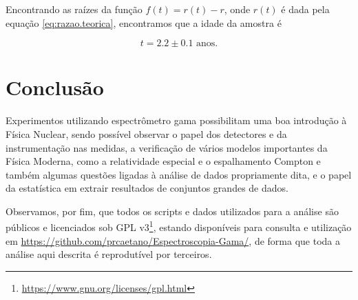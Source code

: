 \documentclass[a4paper, 11pt, notitlepage]{article}
\numberwithin{equation}{section}  %
\begin{document}
Encontrando as raízes da função $f(t) = r(t) - r$, onde $r(t)$ é dada pela equação \eqref{eq:razao.teorica}, encontramos que a idade da amostra é

\[ t = 2.2 \pm 0.1 \text{ anos.} \]

\section{Conclusão}

Experimentos utilizando espectrômetro gama possibilitam uma boa introdução à Física Nuclear, sendo possível observar o papel dos detectores e da instrumentação nas medidas, a verificação de vários modelos importantes da Física Moderna, como a relatividade especial e o espalhamento Compton e também algumas questões ligadas à análise de dados propriamente dita, e o papel da estatística em extrair resultados de conjuntos grandes de dados.

Observamos, por fim, que todos os scripts e dados utilizados para a análise são públicos e licenciados sob GPL v3\footnote{\url{https://www.gnu.org/licenses/gpl.html}}, estando disponíveis para consulta e utilização em \url{https://github.com/prcaetano/Espectroscopia-Gama/}, de forma que toda a análise aqui descrita é reprodutível por terceiros.

\printbibliography
\end{document}
